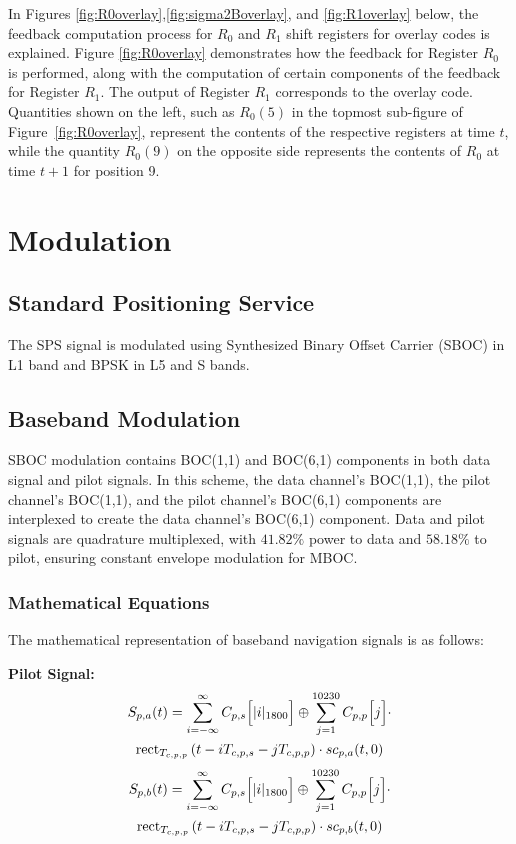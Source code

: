 In Figures \ref{fig:R0overlay},\ref{fig:sigma2Boverlay}, and \ref{fig:R1overlay} below, the feedback computation process for $R_0$ and $R_1$ shift registers for overlay codes is explained. Figure \ref{fig:R0overlay} demonstrates how the feedback for Register $R_0$ is performed, along with the computation of certain components of the feedback for Register $R_1$. The output of Register $R_1$ corresponds to the overlay code. Quantities shown on the left, such as $R_0(5)$ in the topmost sub-figure of Figure~\ref{fig:R0overlay}, represent the contents of the respective registers at time $t$, while the quantity $R_0(9)$ on the opposite side represents the contents of $R_0$ at time $t+1$ for position 9.
\newpage

\section{Modulation}

\subsection{Standard Positioning Service}
\noindent The SPS signal is modulated using Synthesized Binary Offset Carrier (SBOC) in L1 band and BPSK in L5 and  S bands.
\subsection{Baseband Modulation}
\noindent SBOC modulation contains  BOC(1,1) and BOC(6,1) components in both data signal  and pilot signals.  In this scheme, the data channel's BOC(1,1), the pilot channel's BOC(1,1), and the pilot channel's BOC(6,1) components are interplexed to create the data channel's BOC(6,1) component.  Data and pilot signals are quadrature multiplexed, with $41.82\%$ power to data and $58.18\%$ to pilot, ensuring constant envelope modulation for MBOC.
\subsubsection{Mathematical Equations}
\noindent The mathematical representation of baseband navigation signals is as follows:

\noindent\textbf{Pilot Signal:}
\begin{multline}
S_{p,a}(t) = \sum_{i=-\infty}^{\infty} C_{p,s}\Bigl[|i|_{1800}\Bigr] \oplus \sum_{j=1}^{10230}C_{p,p}\Bigl[j\Bigr]\cdot \\
             \text{rect}_{T_{c,p,p}} \left( t - iT_{c,p,s} - jT_{c,p,p}\right) \cdot sc_{p,a}(t, 0)
\label{eq:sp_a}
\end{multline}
\begin{multline}
S_{p,b}(t) =    \sum_{i=-\infty}^{\infty} C_{p,s}\Bigl[|i|_{1800}\Bigr] \oplus \sum_{j=1}^{10230}C_{p,p}\Bigl[j\Bigr]\cdot \\
    \text{rect}_{T_{c,p,p}} \left( t - iT_{c,p,s} - jT_{c,p,p}\right) \cdot sc_{p,b}(t, 0)
\label{eq:sp_b}
\end{multline}

